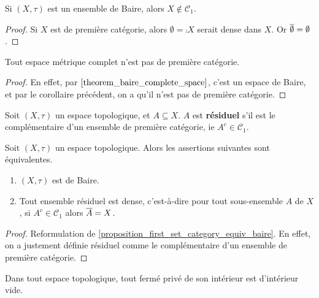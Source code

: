\begin{corollary}
	Si $(X, \tau)$ est un ensemble de Baire, alors $X \notin \mathcal{C}_{1}$.
\end{corollary}

\ifdefined\outputproof
\begin{proof}
	Si $X$ est de première catégorie, alors $\emptyset = \comp{X}$ serait dense
	dans $X$. Or $\overline{\emptyset} = \emptyset$.
\end{proof}
\fi

\begin{corollary}
	Tout espace métrique complet n'est pas de première catégorie.
\end{corollary}

\ifdefined\outputproof
\begin{proof}
	En effet, par $\ref{theorem_baire_complete_space}$, c'est un espace de
	Baire, et par le corollaire précédent, on a qu'il n'est pas de première catégorie.
\end{proof}
\fi

\begin{definition} [Résiduel]
	Soit $(X, \tau)$ un espace topologique, et $A \subseteq X$.
	$A$ est \textbf{résiduel} s'il est le complémentaire d'un ensemble de
	première catégorie, ie $A^{c} \in \mathcal{C}_{1}$.
\end{definition}

\begin{proposition}
	\label{proposition_residual_equiv_baire}
	Soit $(X, \tau)$ un espace topologique. Alors les assertions suivantes sont
	équivalentes.
	\begin{enumerate}
		\item $(X, \tau)$ est de Baire.
		\item Tout ensemble résiduel est dense, c'est-à-dire pour tout
			sous-ensemble $A$ de $X$, si $A^{c} \in \mathcal{C}_{1}$ alors
			$\overline{A} = X$.
	\end{enumerate}
\end{proposition}

\ifdefined\outputproof
\begin{proof}
	Reformulation de \ref{proposition_first_set_category_equiv_baire}. En effet,
	on a justement définie résiduel comme le complémentaire d'un ensemble de
	première catégorie.
\end{proof}
\fi

\begin{proposition}
	Dans tout espace topologique, tout fermé privé de son intérieur est
	d'intérieur vide.
\end{proposition}

